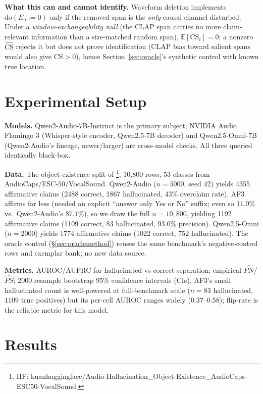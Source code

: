 \documentclass{article}
\begin{document}
\textbf{What this can and cannot identify.} Waveform deletion implements
$\mathrm{do}(E_o{:=}0)$ only if the removed span is the \emph{only}
causal channel disturbed. Under a \emph{window-exchangeability null}
(the CLAP span carries no more claim-relevant information than a
size-matched random span), $\mathbb{E}[\mathrm{CS}_i]=0$; a nonzero
$\hat{\mathrm{CS}}$ rejects it but does not prove identification (CLAP
bias toward salient spans would also give $\mathrm{CS}>0$), hence
Section~\ref{sec:oracle}'s synthetic control with known true location.

\section{Experimental Setup}

\textbf{Models.} Qwen2-Audio-7B-Instruct \cite{chu2023qwen2audio} is
the primary subject; NVIDIA Audio Flamingo 3
\cite{goel2025audioflamingo3} (Whisper-style encoder, Qwen2.5-7B
decoder) and Qwen2.5-Omni-7B \cite{qwen25omni2025} (Qwen2-Audio's
lineage, newer/larger) are cross-model checks. All three queried
identically black-box.

\textbf{Data.} The object-existence split of
\cite{kuan2025can}\footnote{\raggedright HF: kuanhuggingface/Audio-Hallucination\_Object-Existence\_AudioCaps-ESC50-VocalSound.},
10{,}800 rows, 53 classes from AudioCaps/ESC-50/VocalSound. Qwen2-Audio
($n{=}5000$, seed 42) yields 4355 affirmative claims (2488 correct,
1867 hallucinated, $43\%$ overclaim rate). AF3 affirms far less
(needed an explicit ``answer only Yes or No'' suffix; even so
$11.0\%$ vs.\ Qwen2-Audio's $87.1\%$), so we draw the full $n{=}10{,}800$,
yielding 1192 affirmative claims (1109 correct, 83 hallucinated,
$93.0\%$ precision). Qwen2.5-Omni ($n{=}2000$) yields 1774 affirmative
claims (1022 correct, 752 hallucinated). The oracle control
(\S\ref{sec:oraclemethod}) reuses the same benchmark's negative-control
rows and exemplar bank; no new data source.

\textbf{Metrics.} AUROC/AUPRC for hallucinated-vs-correct separation;
empirical $\hat{PN}$/$\hat{PS}$; 2000-resample bootstrap 95\%
confidence intervals (CIs).
AF3's small hallucinated count is well-powered at full-benchmark scale
($n{=}83$ hallucinated, $1109$ true positives) but its per-cell AUROC
ranges widely ($0.37$--$0.58$); flip-rate is the reliable metric for
this model.

\section{Results}\label{sec:results}
\end{document}
